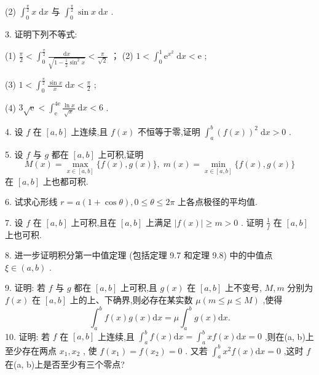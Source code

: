 (2) \({\int }_{0}^{\frac{\pi }{2}}x\mathrm{\;d}x\) 与 \({\int }_{0}^{\frac{\pi }{2}}\sin x\mathrm{\;d}x\) .

3. 证明下列不等式:

(1) \(\frac{\pi }{2} < {\int }_{0}^{\frac{\pi }{2}}\frac{\mathrm{d}x}{\sqrt{1 - \frac{1}{2}{\sin }^{2}x}} < \frac{\pi }{\sqrt{2}}\) ； (2) \(1 < {\int }_{0}^{1}{\mathrm{e}}^{{x}^{2}}\mathrm{\;d}x < \mathrm{e}\) ;

(3) \(1 < {\int }_{0}^{\frac{\pi }{2}}\frac{\sin x}{x}\mathrm{\;d}x < \frac{\pi }{2}\) ;

(4) \(3\sqrt{\mathrm{e}} < {\int }_{\mathrm{e}}^{4\mathrm{e}}\frac{\ln x}{\sqrt{x}}\mathrm{\;d}x < 6\) .

4. 设 \(f\) 在 \(\left\lbrack  {a,b}\right\rbrack\) 上连续,且 \(f\left( x\right)\) 不恒等于零,证明 \({\int }_{a}^{b}{\left( f\left( x\right) \right) }^{2}\mathrm{\;d}x > 0\) .

5. 设 \(f\) 与 \(g\) 都在 \(\left\lbrack  {a,b}\right\rbrack\) 上可积,证明
\[
M\left( x\right)  = \mathop{\max }\limits_{{x \in  \left\lbrack  {a,b}\right\rbrack  }}\{ f\left( x\right) ,g\left( x\right) \} ,\;m\left( x\right)  = \mathop{\min }\limits_{{x \in  \left\lbrack  {a,b}\right\rbrack  }}\{ f\left( x\right) ,g\left( x\right) \}
\]
在 \(\left\lbrack  {a,b}\right\rbrack\) 上也都可积.

6. 试求心形线 \(r = a\left( {1 + \cos \theta }\right) ,0 \leq  \theta  \leq  {2\pi }\) 上各点极径的平均值.

7. 设 \(f\) 在 \(\left\lbrack  {a,b}\right\rbrack\) 上可积,且在 \(\left\lbrack  {a,b}\right\rbrack\) 上满足 \(\left| {f\left( x\right) }\right|  \geq  m > 0\) . 证明 \(\frac{1}{f}\) 在 \(\left\lbrack  {a,b}\right\rbrack\) 上也可积.

8. 进一步证明积分第一中值定理 (包括定理 9.7 和定理 9.8) 中的中值点 \(\xi  \in  \left( {a,b}\right)\) .

9. 证明: 若 \(f\) 与 \(g\) 都在 \(\left\lbrack  {a,b}\right\rbrack\) 上可积,且 \(g\left( x\right)\) 在 \(\left\lbrack  {a,b}\right\rbrack\) 上不变号, \(M,m\) 分别为 \(f\left( x\right)\) 在 \(\left\lbrack  {a,b}\right\rbrack\) 上的上、下确界,则必存在某实数 \(\mu \left( {m \leq  \mu  \leq  M}\right)\) ,使得
\[
{\int }_{a}^{b}f\left( x\right) g\left( x\right) \mathrm{d}x = \mu {\int }_{a}^{b}g\left( x\right) \mathrm{d}x.
\]
10. 证明: 若 \(f\) 在 \(\left\lbrack  {a,b}\right\rbrack\) 上连续,且 \({\int }_{a}^{b}f\left( x\right) \mathrm{d}x = {\int }_{a}^{b}{xf}\left( x\right) \mathrm{d}x = 0\) ,则在(a, b)上至少存在两点 \({x}_{1},{x}_{2}\) , 使 \(f\left( {x}_{1}\right)  = f\left( {x}_{2}\right)  = 0\) . 又若 \({\int }_{a}^{b}{x}^{2}f\left( x\right) \mathrm{d}x = 0\) ,这时 \(f\) 在(a, b)上是否至少有三个零点?


